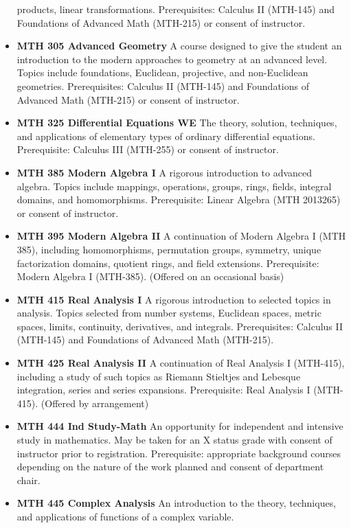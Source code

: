 \documentclass[
  letterpaper,
]{scrbook}
\begin{document}
\begin{itemize}
  products, linear transformations. Prerequisites: Calculus II (MTH-145)
  and Foundations of Advanced Math (MTH-215) or consent of instructor.
\item
  \textbf{MTH 305 Advanced Geometry} A course designed to give the
  student an introduction to the modern approaches to geometry at an
  advanced level. Topics include foundations, Euclidean, projective, and
  non-Euclidean geometries. Prerequisites: Calculus II (MTH-145) and
  Foundations of Advanced Math (MTH-215) or consent of instructor.
\item
  \textbf{MTH 325 Differential Equations WE} The theory, solution,
  techniques, and applications of elementary types of ordinary
  differential equations. Prerequisite: Calculus III (MTH-255) or
  consent of instructor.
\item
  \textbf{MTH 385 Modern Algebra I} A rigorous introduction to advanced
  algebra. Topics include mappings, operations, groups, rings, fields,
  integral domains, and homomorphisms. Prerequisite: Linear Algebra (MTH
  2013265) or consent of instructor.
\item
  \textbf{MTH 395 Modern Algebra II} A continuation of Modern Algebra I
  (MTH 385), including homomorphisms, permutation groups, symmetry,
  unique factorization domains, quotient rings, and field extensions.
  Prerequisite: Modern Algebra I (MTH-385). (Offered on an occasional
  basis)
\item
  \textbf{MTH 415 Real Analysis I} A rigorous introduction to selected
  topics in analysis. Topics selected from number systems, Euclidean
  spaces, metric spaces, limits, continuity, derivatives, and integrals.
  Prerequisites: Calculus II (MTH-145) and Foundations of Advanced Math
  (MTH-215).
\item
  \textbf{MTH 425 Real Analysis II} A continuation of Real Analysis I
  (MTH-415), including a study of such topics as Riemann Stieltjes and
  Lebesque integration, series and series expansions. Prerequisite: Real
  Analysis I (MTH-415). (Offered by arrangement)
\item
  \textbf{MTH 444 Ind Study-Math} An opportunity for independent and
  intensive study in mathematics. May be taken for an X status grade
  with consent of instructor prior to registration. Prerequisite:
  appropriate background courses depending on the nature of the work
  planned and consent of department chair.
\item
  \textbf{MTH 445 Complex Analysis} An introduction to the theory,
  techniques, and applications of functions of a complex variable.

\end{itemize}
\end{document}
